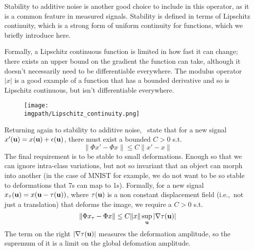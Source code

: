   Stability to additive noise is another good choice to include in this operator,
  as it is a common feature in measured signals. Stability is defined in terms of
  Lipschitz continuity, which is a strong form of uniform continuity for
  functions, which we briefly introduce here.

  Formally, a Lipschitz continuous function is limited in how fast it can change;
  there exists an upper bound on the gradient the function can take, although it
  doesn't necessarily need to be differentiable everywhere. The modulus operator
  $|x|$ is a good example of a function that has a bounded derivative and so is
  Lipschitz continuous, but isn't differentiable everywhere.

  \begin{figure}
    \begin{center}
      \texttt{[image: \\imgpath/Lipschitz\_continuity.png]}
      \label{fig:lipschitz}
    \end{center}
  \end{figure}

  Returning again to stability to additive noise, \Bruna\ state that for a new
  signal $x'(\mathbf{u}) = x(\mathbf{u}) + \epsilon(\mathbf{u})$, there must exist
  a bounded $C>0$ s.t.
  \begin{equation}\label{eq:scat_noise_stability}
    \|\Phi x' - \Phi x\| \leq C \|x' - x\|
  \end{equation}
  The final requirement is to be stable to small deformations. Enough so that we
  can ignore intra-class variations, but not so invariant that an object can
  morph into another (in the case of MNIST for example, we do not want to be so
  stable to deformations that 7s can map to 1s). Formally, for a new signal
  $x_{\tau}(\mathbf{u}) = x(\mathbf{u}-\tau(\mathbf{u}))$, where $\tau(\mathbf{u})$ is a non
  constant displacement field (i.e.,\ not just a translation) that deforms the
  image, we require a $C>0$ s.t.
  \protect\begin{equation}\label{eq:scat_deformation_stability}
    \|\Phi x_{\tau} - \Phi x \| \leq C \|x\| \sup_{\mathbf{u}} |\nabla\tau(\mathbf{u})|
  \protect\end{equation}
  The term on the right $|\nabla\tau(\mathbf{u})|$ measures the deformation
  amplitude, so the supremum of it is a limit on the global defomation amplitude.

